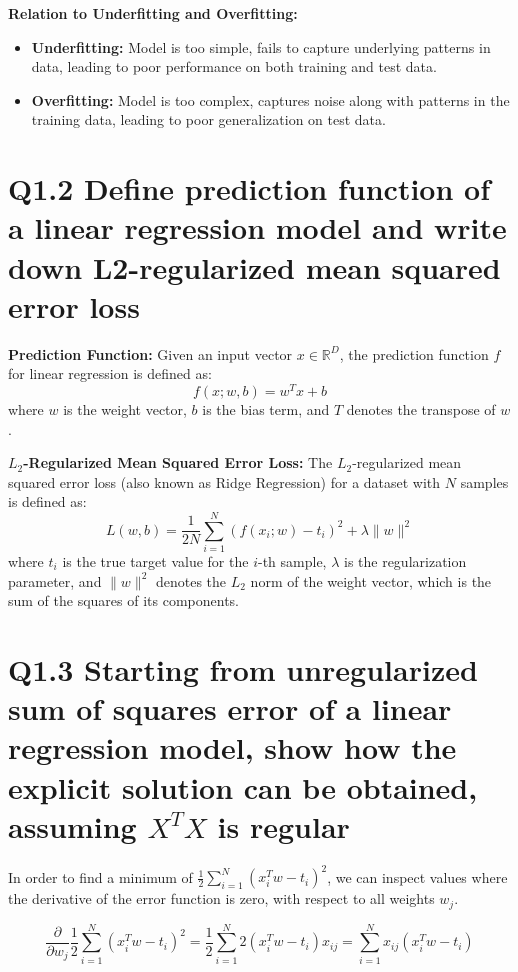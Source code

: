 \documentclass[11pt]{article}
\begin{document}
\textbf{Relation to Underfitting and Overfitting:}
\begin{itemize}
    \item \textbf{Underfitting:} Model is too simple, fails to capture underlying patterns in data, leading to poor performance on both training and test data.
    \item \textbf{Overfitting:} Model is too complex, captures noise along with patterns in the training data, leading to poor generalization on test data.
\end{itemize}



\section{Q1.2 Define prediction function of a linear regression model and write down L2-regularized mean squared error loss}

\textbf{Prediction Function:}
Given an input vector \( x \in \mathbb{R}^D \), the prediction function \( f \) for linear regression is defined as:
\[
f(x; w, b) = w^T x + b
\]
where \( w \) is the weight vector, \( b \) is the bias term, and \( T \) denotes the transpose of \( w \).

\textbf{\( L_2 \)-Regularized Mean Squared Error Loss:}
The \( L_2 \)-regularized mean squared error loss (also known as Ridge Regression) for a dataset with \( N \) samples is defined as:
\[
L(w, b) = \frac{1}{2N} \sum_{i=1}^{N} (f(x_i; w) - t_i)^2 + \lambda \| w \|^2
\]
where \( t_i \) is the true target value for the \( i \)-th sample, \( \lambda \) is the regularization parameter, and \( \| w \|^2 \) denotes the \( L_2 \) norm of the weight vector, which is the sum of the squares of its components.


\section{Q1.3 Starting from unregularized sum of squares error of a linear regression model, show how the explicit solution can be obtained, assuming \(X^TX\) is regular}

In order to find a minimum of \( \frac{1}{2} \sum_{i=1}^{N} (x_i^T w - t_i)^2 \), we can inspect values where the derivative of the error function is zero, with respect to all weights \( w_j \).

\[
\frac{\partial}{\partial w_j} \frac{1}{2} \sum_{i=1}^{N} (x_i^T w - t_i)^2 = \frac{1}{2} \sum_{i=1}^{N} 2(x_i^T w - t_i)x_{ij} = \sum_{i=1}^{N} x_{ij}(x_i^T w - t_i)
\]
\end{document}
